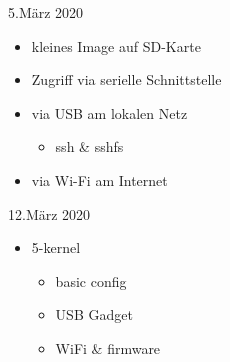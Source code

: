 \documentclass{beamer}
\begin{document}
\begin{frame}{5.März 2020}
 \begin{itemize}
  \item \targetS kleines Image auf SD-Karte
  \item Zugriff via serielle Schnittstelle
  \item via USB am lokalen Netz
  \begin{itemize}
    \item ssh \& sshfs
  \end{itemize}
  \item via Wi-Fi am Internet
 \end{itemize}
\end{frame}
%
\begin{frame}{12.März 2020}
 \begin{itemize}
  \item 5-kernel
  \begin{itemize}
   \item basic config
   \item USB Gadget
   \item WiFi \& firmware
  \end{itemize}
 \end{itemize}
\end{frame}
%
%
\end{document}
